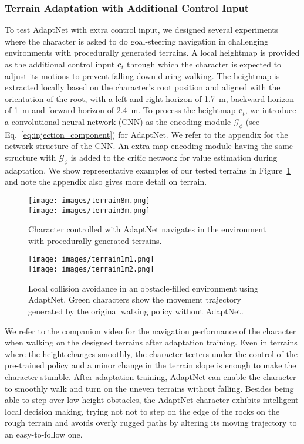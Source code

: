 \subsubsection{Terrain Adaptation with Additional Control Input}
To test AdaptNet with extra control input, 
we designed several experiments where the character is asked to do goal-steering navigation in challenging environments with procedurally generated terrains.
A local heightmap is provided as the additional control input $\mathbf{c}_t$ through which the character is expected to adjust its motions to prevent falling down during walking.
The heightmap is extracted locally based on the character's root position and aligned with the orientation of the root,
with a left and right horizon of 1.7~m, backward horizon of 1~m and forward horizon of 2.4~m.
To process the heightmap $\mathbf{c}_t$, we introduce a convolutional neural network (CNN) as the encoding module $\mathcal{G}_\phi$ (see Eq.~\ref{eq:injection_component}) for AdaptNet.
We refer to the appendix %
for the network structure of the CNN.
An extra map encoding module having the same structure with $\mathcal{G}_\phi$ is added to the critic network for value estimation during adaptation.
We show representative examples %
of our tested terrains in Figure~\ref{fig:terrain_traj} and note the appendix also gives more detail on terrain.

\begin{figure}[t]
    \centering
    \texttt{[image: images/terrain8m.png]}\\\vspace{0.05cm}
    \texttt{[image: images/terrain3m.png]}
    \caption{Character controlled with AdaptNet navigates in the environment with procedurally generated terrains. %
    }
    \label{fig:terrain_traj}
\end{figure}
\begin{figure}[t]
    \centering
    \texttt{[image: images/terrain1m1.png]}\\\vspace{0.05cm}
    \texttt{[image: images/terrain1m2.png]}
    \caption{Local collision avoidance in an obstacle-filled environment using AdaptNet. Green characters show the movement trajectory generated by the %
    original walking policy without AdaptNet.  
    }
    \label{fig:terrain_ca}
\end{figure}

We refer to the companion video for the navigation performance of the character when walking on the %
designed terrains after adaptation training.
Even in %
terrains where the height changes smoothly,
the character teeters under the control of the pre-trained policy and a minor change in the terrain slope is enough to make the character stumble.
After adaptation training,
AdaptNet can 
enable the character to smoothly walk and turn on the uneven terrains without falling. 
Besides being able to step over low-height obstacles, the AdaptNet character exhibits intelligent local decision making, trying not 
not to step on the edge of the rocks on the rough terrain and avoids overly rugged paths by altering its moving trajectory to an easy-to-follow one.

